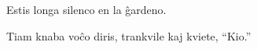 















Estis longa silenco en la ĝardeno.

Tiam knaba voĉo diris, trankvile kaj kviete, “Kio.”
